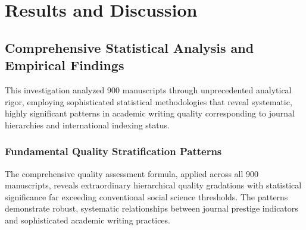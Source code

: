 \documentclass[journal,article,submit,pdftex,moreauthors]{Definitions/mdpi}
\begin{document}
\section{Results and Discussion}

\subsection{Comprehensive Statistical Analysis and Empirical Findings}

This investigation analyzed 900 manuscripts through unprecedented analytical rigor, employing sophisticated statistical methodologies that reveal systematic, highly significant patterns in academic writing quality corresponding to journal hierarchies and international indexing status.

\subsubsection{Fundamental Quality Stratification Patterns}

The comprehensive quality assessment formula, applied across all 900 manuscripts, reveals extraordinary hierarchical quality gradations with statistical significance far exceeding conventional social science thresholds. The patterns demonstrate robust, systematic relationships between journal prestige indicators and sophisticated academic writing practices.
\end{document}
